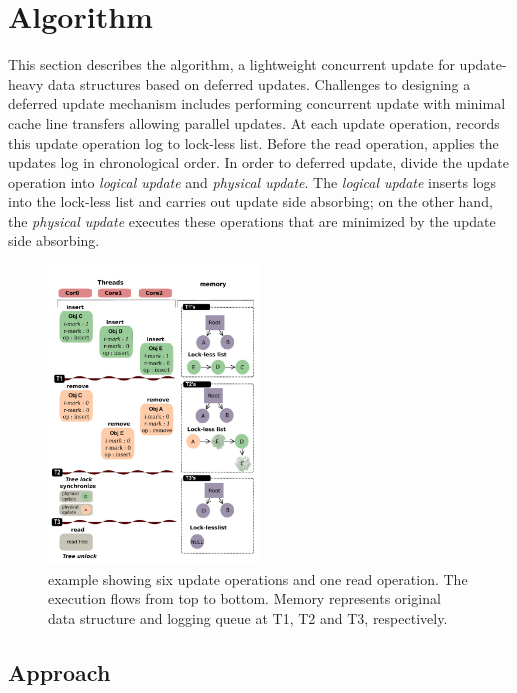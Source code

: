 \section{ Algorithm}
This section describes the  algorithm, a lightweight concurrent
update for update-heavy data structures based on deferred updates.
Challenges to designing a deferred update mechanism includes 
performing concurrent update with minimal
cache line transfers allowing parallel updates.
At each update operation,  records this update
operation log to lock-less list.
Before the read operation,  applies the updates log in chronological
order.
In order to deferred update,  divide the update operation 
into \emph{logical update} and
\emph{physical update}.
The \emph{logical update} inserts logs into the lock-less list and carries out
update side absorbing; on the other hand, the \emph{physical update} executes
these operations that are minimized by the update side absorbing.

\begin{figure}[tb]
  \begin{center}
    \includegraphics[width=0.5\textwidth,height=0.5\textheight,keepaspectratio]{fig/basic}
  \end{center}
  \caption{ example showing six update operations and one read
  operation. The execution flows from top to bottom. Memory represents original
  data structure and logging queue at T1, T2 and T3, respectively.}
  \label{fig:basic}
\end{figure}

\subsection{Approach}


